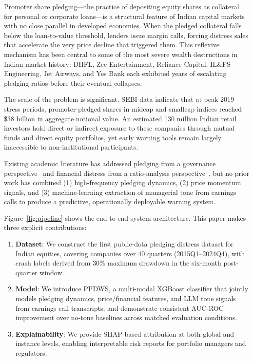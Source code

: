 \documentclass[conference]{IEEEtran}
\begin{document}
Promoter share pledging---the practice of depositing equity shares as
collateral for personal or corporate loans---is a structural feature of
Indian capital markets with no close parallel in developed economies.
When the pledged collateral falls below the loan-to-value threshold,
lenders issue margin calls, forcing distress sales that accelerate the
very price decline that triggered them. This reflexive mechanism has been
central to some of the most severe wealth destructions in Indian market
history: DHFL, Zee Entertainment, Reliance Capital, IL\&FS Engineering,
Jet Airways, and Yes Bank each exhibited years of escalating pledging
ratios before their eventual collapses.

The scale of the problem is significant. SEBI data indicate that at peak
2019 stress periods, promoter-pledged shares in midcap and smallcap
indices reached \$38 billion in aggregate notional value. An estimated
130 million Indian retail investors hold direct or indirect exposure to
these companies through mutual funds and direct equity portfolios, yet
early warning tools remain largely inaccessible to non-institutional
participants.

Existing academic literature has addressed pledging from a governance
perspective~\cite{mishra2024pledging} and financial distress from a
ratio-analysis perspective~\cite{altman1968}, but no prior work has
combined (1) high-frequency pledging dynamics, (2) price momentum
signals, and (3) machine-learning extraction of managerial tone from
earnings calls to produce a predictive, operationally deployable
warning system.

Figure~\ref{fig:pipeline} shows the end-to-end system architecture.
This paper makes three explicit contributions:
\begin{enumerate}
  \item \textbf{Dataset}: We construct the first public-data pledging
    distress dataset for Indian equities, covering
     companies over 40 quarters (2015Q1--2024Q4),
    with crash labels derived from 30\% maximum drawdown in the
    six-month post-quarter window.
  \item \textbf{Model}: We introduce PPDWS, a multi-modal XGBoost
    classifier that jointly models pledging dynamics, price/financial
    features, and LLM tone signals from earnings call transcripts, and
    demonstrate consistent AUC-ROC improvement over
    no-tone baselines across matched evaluation conditions.
  \item \textbf{Explainability}: We provide SHAP-based attribution
    at both global and instance levels, enabling interpretable
    risk reports for portfolio managers and regulators.
\end{enumerate}
\end{document}
